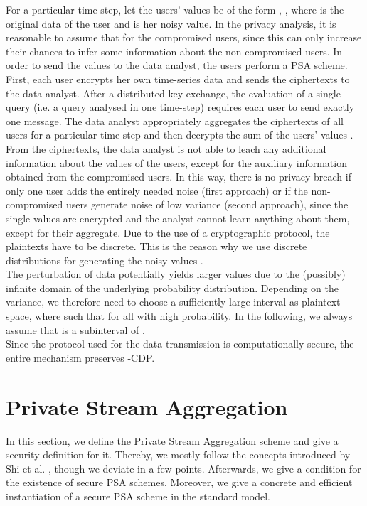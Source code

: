 \documentclass[10pt]{extarticle}
\begin{document}
For a particular time-step, let the users' values be of the form , , where  is the original data of the user  and  is her noisy value. In the privacy analysis, it is reasonable to assume that  for the  compromised users, since this can only increase their chances to infer some information about the non-compromised users. In order to send the values to the data analyst, the users perform a PSA scheme. First, each user encrypts her own time-series data and sends the ciphertexts to the data analyst. After a distributed key exchange, the evaluation of a single query (i.e. a query analysed in one time-step) requires each user to send exactly one message. The data analyst appropriately aggregates the ciphertexts of all users for a particular time-step and then decrypts the sum of the users' values . From the ciphertexts, the data analyst is not able to leach any additional information about the values of the users, except for the auxiliary information obtained from the compromised users. In this way, there is no privacy-breach if only one user adds the entirely needed noise (first approach) or if the non-compromised users generate noise of low variance (second approach), since the single values are encrypted and the analyst cannot learn anything about them, except for their aggregate. Due to the use of a cryptographic protocol, the plaintexts have to be discrete. This is the reason why we use discrete distributions for generating the noisy values .\\
The perturbation of data potentially yields larger values  due to the (possibly) infinite domain of the underlying probability distribution. Depending on the variance, we therefore need to choose a sufficiently large interval  as plaintext space, where  such that  for all  with high probability. In the following, we always assume that  is a subinterval of .\\
Since the protocol used for the data transmission is computationally secure, the entire mechanism preserves -\mbox{\upshape\sffamily CDP}.




\section{Private Stream Aggregation}\label{psa}

In this section, we define the Private Stream Aggregation scheme and give a security definition for it. Thereby, we mostly follow the concepts introduced by Shi et al. \cite{2}, though we deviate in a few points. Afterwards, we give a condition for the existence of secure PSA schemes. Moreover, we give a concrete and efficient instantiation of a secure PSA scheme in the standard model.
\end{document}
